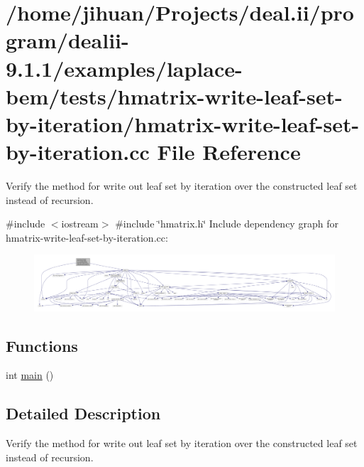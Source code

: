 \hypertarget{hmatrix-write-leaf-set-by-iteration_8cc}{}\section{/home/jihuan/\+Projects/deal.ii/program/dealii-\/9.1.1/examples/laplace-\/bem/tests/hmatrix-\/write-\/leaf-\/set-\/by-\/iteration/hmatrix-\/write-\/leaf-\/set-\/by-\/iteration.cc File Reference}
\label{hmatrix-write-leaf-set-by-iteration_8cc}


Verify the method for write out leaf set by iteration over the constructed leaf set instead of recursion.  


{\ttfamily \#include $<$iostream$>$}\newline
{\ttfamily \#include \char`\"{}hmatrix.\+h\char`\"{}}\newline
Include dependency graph for hmatrix-\/write-\/leaf-\/set-\/by-\/iteration.cc\+:
\nopagebreak
\begin{figure}[H]
\begin{center}
\leavevmode
\includegraphics[width=350pt]{hmatrix-write-leaf-set-by-iteration_8cc__incl}
\end{center}
\end{figure}
\subsection*{Functions}
\begin{DoxyCompactItemize}
\item 
int \hyperlink{hmatrix-write-leaf-set-by-iteration_8cc_ae66f6b31b5ad750f1fe042a706a4e3d4}{main} ()
\end{DoxyCompactItemize}


\subsection{Detailed Description}
Verify the method for write out leaf set by iteration over the constructed leaf set instead of recursion. 

